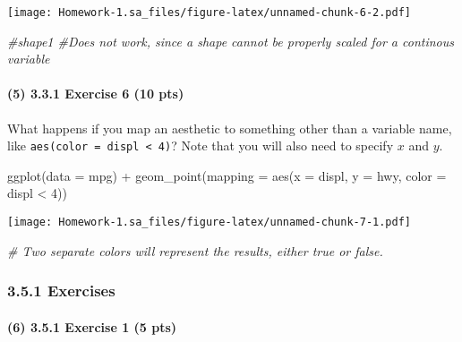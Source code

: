 \documentclass[
]{article}
\newenvironment{Shaded}{\begin{snugshade}}{\end{snugshade}}
\newcommand{\AttributeTok}[1]{\textcolor[rgb]{0.77,0.63,0.00}{#1}}
\newcommand{\CommentTok}[1]{\textcolor[rgb]{0.56,0.35,0.01}{\textit{#1}}}
\newcommand{\DecValTok}[1]{\textcolor[rgb]{0.00,0.00,0.81}{#1}}
\newcommand{\FunctionTok}[1]{\textcolor[rgb]{0.00,0.00,0.00}{#1}}
\newcommand{\NormalTok}[1]{#1}
\newcommand{\SpecialCharTok}[1]{\textcolor[rgb]{0.00,0.00,0.00}{#1}}
\begin{document}
\texttt{[image: Homework-1.sa\_files/figure-latex/unnamed-chunk-6-2.pdf]}

\begin{Shaded}
\begin{Highlighting}[]
\CommentTok{\#shape1 \#Does not work, since a shape cannot be properly scaled for a continous variable}
\end{Highlighting}
\end{Shaded}

\hypertarget{exercise-6-10-pts}{%
\paragraph{(5) 3.3.1 Exercise 6 (10 pts)}\label{exercise-6-10-pts}}

What happens if you map an aesthetic to something other than a variable
name, like \texttt{aes(color\ =\ displ\ \textless{}\ 4)}? Note that you
will also need to specify \(x\) and \(y\).

\begin{Shaded}
\begin{Highlighting}[]
\FunctionTok{ggplot}\NormalTok{(}\AttributeTok{data =}\NormalTok{ mpg) }\SpecialCharTok{+}
  \FunctionTok{geom\_point}\NormalTok{(}\AttributeTok{mapping =} \FunctionTok{aes}\NormalTok{(}\AttributeTok{x =}\NormalTok{ displ, }\AttributeTok{y =}\NormalTok{ hwy, }\AttributeTok{color =}\NormalTok{ displ }\SpecialCharTok{\textless{}} \DecValTok{4}\NormalTok{))}
\end{Highlighting}
\end{Shaded}

\texttt{[image: Homework-1.sa\_files/figure-latex/unnamed-chunk-7-1.pdf]}

\begin{Shaded}
\begin{Highlighting}[]
\CommentTok{\# Two separate colors will represent the results, either true or false.}
\end{Highlighting}
\end{Shaded}

\hypertarget{exercises-2}{%
\subsubsection{3.5.1 Exercises}\label{exercises-2}}

\hypertarget{exercise-1-5-pts}{%
\paragraph{(6) 3.5.1 Exercise 1 (5 pts)}\label{exercise-1-5-pts}}
\end{document}
